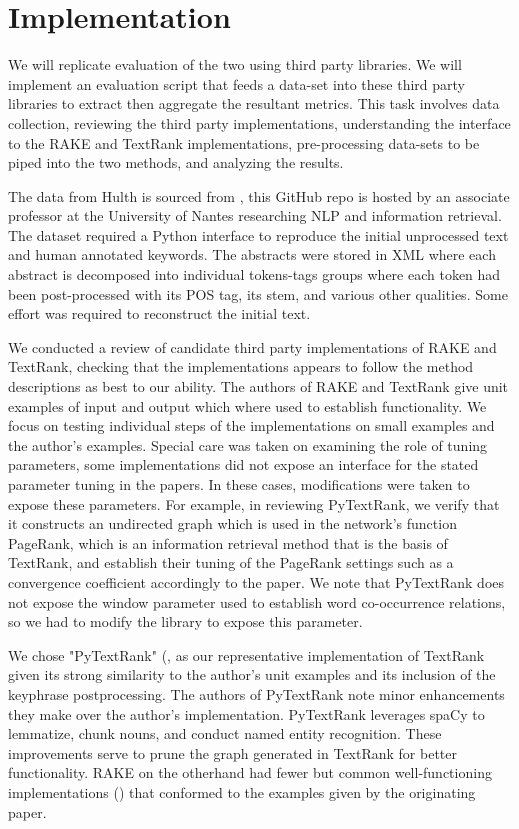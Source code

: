 \documentclass[11pt,a4paper]{article}
\begin{document}
\section{Implementation}
We will replicate  evaluation of the two using third party libraries. We will implement an evaluation script that feeds a data-set into these third party libraries to extract then aggregate the resultant metrics. This task involves data collection, reviewing the third party implementations, understanding the interface to the RAKE and TextRank implementations, pre-processing data-sets to be piped into the two methods, and analyzing the results.

The data from Hulth is sourced from \citet{Boudin}, this GitHub repo is hosted by an associate professor at the University of Nantes researching NLP and information retrieval. The dataset required a Python interface to reproduce the initial unprocessed text and human annotated keywords. The abstracts were stored in XML where each abstract is decomposed into individual tokens-tags groups where each token had been post-processed with its POS tag, its stem, and various other qualities. Some effort was required to reconstruct the initial text.

We conducted a review of candidate third party implementations of RAKE and TextRank, checking that the implementations appears to follow the method descriptions as best to our ability. The authors of RAKE and TextRank give unit examples of input and output which where used to establish functionality. We focus on testing individual steps of the implementations on small examples and the author's examples. Special care was taken on examining the role of tuning parameters, some implementations did not expose an interface for the stated parameter tuning in the papers. In these cases, modifications were taken to expose these parameters. For example, in reviewing PyTextRank, we verify that it constructs an undirected graph which is used in the network's function PageRank, which is an information retrieval method that is the basis of TextRank, and establish their tuning of the PageRank settings such as a convergence coefficient accordingly to the paper. We note that PyTextRank does not expose the window parameter used to establish word co-occurrence relations, so we had to modify the library to expose this parameter.

We chose "PyTextRank" (\citet{PyTextRank}, as our representative implementation of TextRank given its strong similarity to the author's unit examples and its inclusion of the keyphrase postprocessing. The authors of PyTextRank note minor enhancements they make over the author's implementation. PyTextRank leverages spaCy to lemmatize, chunk nouns, and conduct named entity recognition. These improvements serve to prune the graph generated in TextRank for better functionality. RAKE on the otherhand had fewer but common well-functioning implementations (\citet{2}) that conformed to the examples given by the originating paper. 
\end{document}
